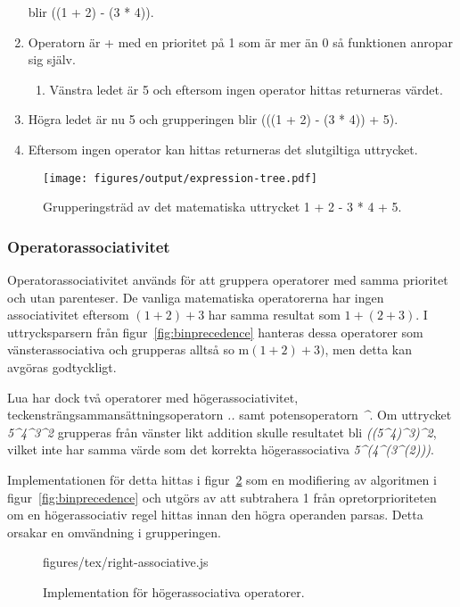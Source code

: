 \begin{enumerate}
    blir ((1 + 2) - (3 * 4)).
  \item Operatorn är + med en prioritet på 1 som är mer än 0 så funktionen
    anropar sig själv.
    \begin{enumerate}
      \item Vänstra ledet är 5 och eftersom ingen operator hittas returneras
        värdet.
    \end{enumerate}
  \item Högra ledet är nu 5 och grupperingen blir (((1 + 2) - (3 * 4)) + 5).
  \item Eftersom ingen operator kan hittas returneras det slutgiltiga
    uttrycket.
\end{enumerate}

\begin{figure}[ht]
  \texttt{[image: figures/output/expression-tree.pdf]}
  \caption{Grupperingsträd av det matematiska uttrycket 1 + 2 - 3 * 4 + 5.}
  \label{fig:expressiontree}
\end{figure}

\subsubsection{Operatorassociativitet}

Operatorassociativitet används för att gruppera operatorer med samma prioritet
och utan parenteser. De vanliga matematiska operatorerna har ingen
associativitet eftersom $(1 + 2) + 3$ har samma resultat som $1 + (2 + 3)$. I
uttrycksparsern från figur~\ref{fig:binprecedence} hanteras dessa operatorer
som vänsterassociativa och grupperas alltså so m$(1 + 2) + 3)$, men detta kan
avgöras godtyckligt.

Lua har dock två operatorer med högerassociativitet,
teckensträngsammansättningsoperatorn \textit{..} samt potensoperatorn
\textit{\^{}}. Om uttrycket \textit{5\^{}4\^{}3\^{}2} grupperas från vänster likt
addition skulle resultatet bli \textit{((5\^{}4)\^{}3)\^{}2}, vilket inte har
samma värde som det korrekta högerassociativa \textit{5\^{}(4\^{}(3\^{}(2)))}.

Implementationen för detta hittas i figur~\ref{fig:rightassociative} som en
modifiering av algoritmen i figur~\ref{fig:binprecedence} och utgörs av att
subtrahera 1 från opretorprioriteten om en högerassociativ regel hittas innan
den högra operanden parsas. Detta orsakar en omvändning i grupperingen.

\begin{figure}[ht]
    {figures/tex/right-associative.js}
  \caption{Implementation för högerassociativa operatorer.}
  \label{fig:rightassociative}
\end{figure}

